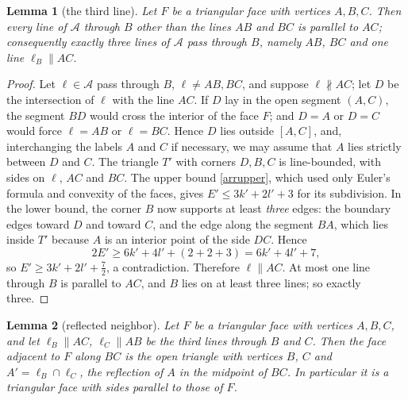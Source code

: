 \documentclass{article}
\newtheorem{lemma}{Lemma}
\begin{document}
	\begin{lemma}[the third line]\label{Lthird}
		Let $F$ be a triangular face with vertices $A,B,C$. Then every line of $\mathcal A$ through $B$ other than the lines $AB$ and $BC$ is parallel to $AC$; consequently exactly three lines of $\mathcal A$ pass through $B$, namely $AB$, $BC$ and one line $\ell_B\parallel AC$.
	\end{lemma}

	\begin{proof}
		Let $\ell\in\mathcal A$ pass through $B$, $\ell\neq AB, BC$, and suppose $\ell\not\parallel AC$; let $D$ be the intersection of $\ell$ with the line $AC$. If $D$ lay in the open segment $(A,C)$, the segment $BD$ would cross the interior of the face $F$; and $D=A$ or $D=C$ would force $\ell=AB$ or $\ell=BC$. Hence $D$ lies outside $[A,C]$, and, interchanging the labels $A$ and $C$ if necessary, we may assume that $A$ lies strictly between $D$ and $C$. The triangle $T'$ with corners $D,B,C$ is line-bounded, with sides on $\ell$, $AC$ and $BC$. The upper bound \eqref{arrupper}, which used only Euler's formula and convexity of the faces, gives $E'\leq 3k'+2l'+3$ for its subdivision. In the lower bound, the corner $B$ now supports at least \emph{three} edges: the boundary edges toward $D$ and toward $C$, and the edge along the segment $BA$, which lies inside $T'$ because $A$ is an interior point of the side $DC$. Hence
		$$2E'\geq 6k'+4l'+(2+2+3)=6k'+4l'+7,$$
		so $E'\geq 3k'+2l'+\tfrac72$, a contradiction. Therefore $\ell\parallel AC$. At most one line through $B$ is parallel to $AC$, and $B$ lies on at least three lines; so exactly three.
	\end{proof}

	\begin{lemma}[reflected neighbor]\label{Lrefl}
		Let $F$ be a triangular face with vertices $A,B,C$, and let $\ell_B\parallel AC$, $\ell_C\parallel AB$ be the third lines through $B$ and $C$. Then the face adjacent to $F$ along $BC$ is the open triangle with vertices $B$, $C$ and $A'=\ell_B\cap\ell_C$, the reflection of $A$ in the midpoint of $BC$. In particular it is a triangular face with sides parallel to those of $F$.
	\end{lemma}
\end{document}
